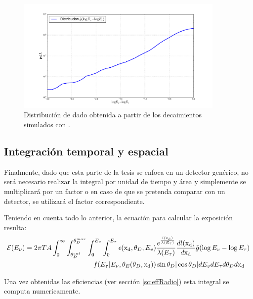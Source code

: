 	 \begin{figure}[h!]
		\begin{center}
			\includegraphics[width=0.9\textwidth]{fig/resultadosRadio/ev_etau}
			\caption{\label{fig:ev_etau} 
			Distribuci\'on de \ev{} dado \etau{} obtenida a partir de los decaimientos simulados con \tauola{}. 
			}
		\end{center}
	\end{figure}
	 
	\subsection{Integraci\'on temporal y espacial}
	Finalmente, dado que esta parte de la tesis se enfoca en un detector gen\'erico, no ser\'a necesario realizar la integral por unidad de tiempo y \'area y simplemente se multiplicar\'a por un factor  o en caso de que se pretenda comparar con un detector, se utilizar\'a el factor correspondiente.
	
	Teniendo en cuenta todo lo anterior, la ecuaci\'on para calcular la exposici\'on resulta:
	\begin{equation}
		\begin{aligned}
			{\cal E} (E_\nu) = 2 \pi T A
			\int_{0}^{\infty} 
			\int_{\theta_D^{cut}}^{\theta_D^{max}} 
			\int_{0}^{E_\nu} 
			\int_{0}^{E_\tau} 
			\epsilon ({\rm x_d},\theta_D,E_v)& 
			\frac{e^{\frac{l({\rm x_d})}{\lambda(E_\tau)}}}{\lambda(E_\tau)}\frac{dl({\rm x_d})}{d{\rm x_d}}
			\tilde{g}(\log E_v-\log E_\tau)\\
			f(E_\tau|E_\nu,\theta_E(\theta_D,{\rm x_d}))
			&\sin \theta_D |\cos \theta_D|
			dE_v dE_\tau  d\theta_D d{\rm x_d}
		\end{aligned}
		\label{eq:exp2ESRadio}
	\end{equation}

	Una vez obtenidas las eficiencias (ver secci\'on \ref{sc:effRadio}) esta integral se computa numericamente.
	
